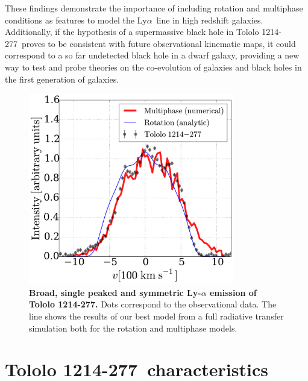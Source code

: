 \documentclass[a4paper, usenatbib, 12pt]{article}
\newcommand{\tol}{Tololo 1214-277}
\newcommand{\lya}{Ly$\alpha$}
\begin{document}
{These findings demonstrate the importance of including rotation and multiphase
conditions as features to model the \lya\ line in high redshift
galaxies.
Additionally, if the hypothesis of a supermassive black
hole in \tol\ proves to be consistent with future observational
kinematic maps, it could correspond to a so far undetected black hole
in a dwarf galaxy, providing a new way to test and probe
theories on the co-evolution of galaxies and black holes in the first
generation of galaxies.  

\begin{figure}
\begin{center}
\includegraphics[width=0.8\textwidth]{CLARA-TOL-main.pdf}
\caption{{\bf Broad, single peaked and symmetric Ly-$\alpha$ emission of \tol.}
  Dots correspond to the observational data. The line shows the results
of our best model from a full radiative transfer simulation both for the rotation and multiphase models.}
\end{center}
\end{figure}

{}


\newpage 

\section*{\tol\ characteristics}


}
\end{document}
